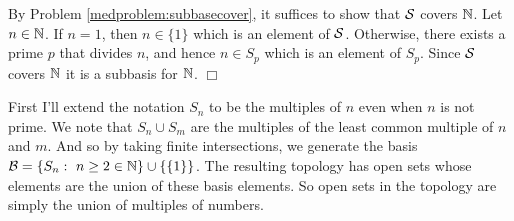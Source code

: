 \documentclass{article}
\begin{document}
 {
    \begin{spacedenumerate}
        \item By Problem \ref{medproblem:subbasecover}, it suffices to show that $\mathcal{S}$ covers $\mathbb{N}$. Let $n\in \mathbb{N}$. If $n = 1$, then $n\in \{1\}$ which is an element of $\mathcal{S}$. Otherwise, there exists a prime $p$ that divides $n$, and hence $n\in S_{p}$ which is an element of $S_{p}$. Since $\mathcal{S}$ covers $\mathbb{N}$ it is a subbasis for $\mathbb{N}$. $\Box$
        \item First I'll extend the notation $S_{n}$ to be the multiples of $n$ even when $n$ is not prime. We note that $S_{n}\cup S_{m}$ are the multiples of the least common multiple of $n$ and $m$. And so by taking finite intersections, we generate the basis $\mathcal{B} = \{S_{n}:\ n\geq 2\in\mathbb{N}\}\cup \{\{1\}\}$. The resulting topology has open sets whose elements are the union of these basis elements. So open sets in the topology are simply the union of multiples of numbers.
    \end{spacedenumerate}
}
\end{document}
